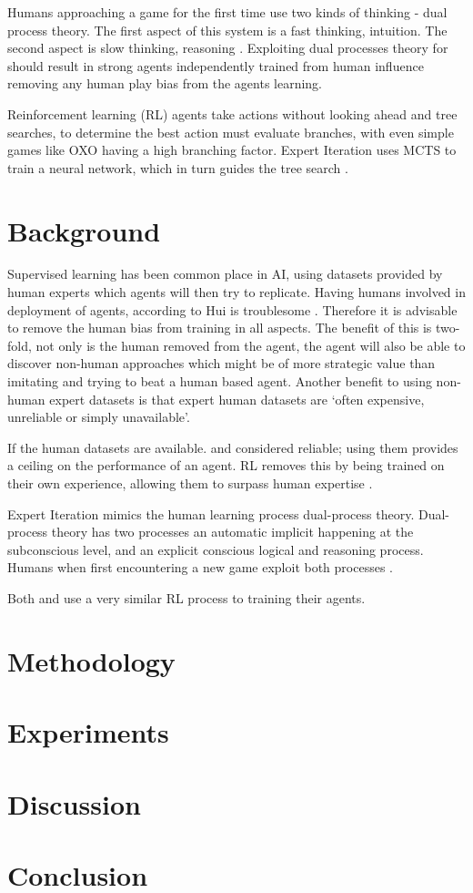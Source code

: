 \documentclass[conference]{IEEEtran}
\begin{document}
Humans approaching a game for the first time use two kinds of thinking - dual process theory. The first aspect of this system is a fast thinking, intuition. The second aspect is slow thinking, reasoning \cite{ExpertIteration}. Exploiting dual processes theory for should result in strong agents independently trained from human influence removing any human play bias from the agents learning.

Reinforcement learning (RL) agents take actions without looking ahead and tree searches, to determine the best action must evaluate branches, with even simple games like OXO having a high branching factor. Expert Iteration uses MCTS to train a neural network, which in turn guides the tree search \cite{ExpertIteration}.  

\section{Background}
Supervised learning has been common place in AI, using datasets provided by human experts which agents will then try to replicate. Having humans involved in deployment of agents, according to Hui is troublesome \cite{huiil}. Therefore it is advisable to remove the human bias from training in all aspects. The benefit of this is two-fold, not only is the human removed from the agent, the agent will also be able to discover non-human approaches which might be of more strategic value than imitating and trying to beat a human based agent. Another benefit to using non-human expert datasets is that expert human datasets are `often expensive, unreliable or simply unavailable'\cite{go}.

If the human datasets are available. and considered reliable; using them provides a ceiling on the performance of an agent. RL removes this by being trained on their own experience, allowing them to surpass human expertise \cite{go}.  

Expert Iteration mimics the human learning process dual-process theory. Dual-process theory has two processes an automatic implicit happening at the subconscious level, and an explicit conscious logical and reasoning process. Humans when first encountering a new game exploit both processes \cite{dualprocess}.       

Both \cite{ExpertIteration} and \cite{go} use a very similar RL process to training their agents.

\section{Methodology}

\section{Experiments}

\section{Discussion}

\section{Conclusion}



\end{document}
